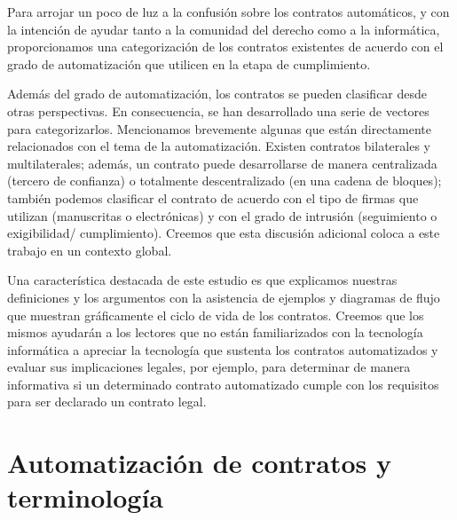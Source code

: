 \documentclass[12pt]{report} %
\begin{document}
\begin{itemize}
Para arrojar un poco de luz a la confusión sobre los contratos automáticos, y con la intención de ayudar tanto a la comunidad del derecho como a la informática, proporcionamos una categorización de los contratos existentes de acuerdo con el grado de automatización que utilicen en la etapa de cumplimiento.

Además del grado de automatización, los contratos se pueden clasificar desde otras perspectivas. En consecuencia, se han desarrollado una serie de vectores para categorizarlos. Mencionamos brevemente algunas que están directamente relacionados con el tema de la automatización. Existen contratos bilaterales y multilaterales; además, un contrato puede desarrollarse de manera centralizada (tercero de confianza) o totalmente descentralizado (en una cadena de bloques); también podemos clasificar el contrato de acuerdo con el tipo de firmas que utilizan (manuscritas o electrónicas) y con el grado de intrusión (seguimiento o exigibilidad/ cumplimiento). Creemos que esta discusión adicional coloca a este trabajo en un contexto global.

Una característica destacada de este estudio es que explicamos nuestras definiciones y los argumentos con la asistencia de ejemplos y diagramas de flujo que muestran gráficamente el ciclo de vida de los contratos. Creemos que los mismos ayudarán a los lectores que no están familiarizados con la tecnología informática a apreciar la tecnología que sustenta los contratos automatizados y evaluar sus implicaciones legales, por ejemplo, para determinar de manera informativa si un determinado contrato automatizado cumple con los requisitos para ser declarado un contrato legal.


\section{Automatización de contratos y terminología}


\end{itemize}
\end{document}
